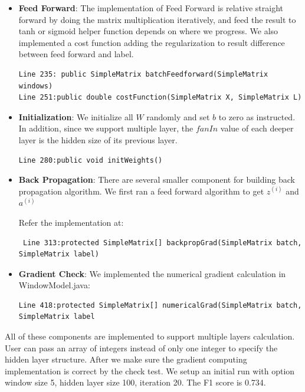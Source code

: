\documentclass[letterpaper]{article}
\begin{document}
\begin{itemize}
\item \textbf{Feed Forward}: The implementation of Feed Forward is relative straight forward by doing the matrix multiplication iteratively, and feed the result to tanh or sigmoid helper function depends on where we progress. We also implemented a cost function adding the regularization to result difference between feed forward and label.
\begin{verbatim}
Line 235: public SimpleMatrix batchFeedforward(SimpleMatrix windows)
Line 251:public double costFunction(SimpleMatrix X, SimpleMatrix L)
\end{verbatim}

\item \textbf{Initialization}: We initialize all $W$ randomly and set $b$ to zero as instructed. In addition, since we support multiple layer, the $fanIn$ value of each deeper layer is the hidden size of its previous layer.
\begin{verbatim}
Line 280:public void initWeights()
\end{verbatim}
\item \textbf{Back Propagation}: There are several smaller component for building back propagation algorithm.
We first ran a feed forward algorithm to get $z^{(i)}$ and $a^{(i)}$

Refer the implementation at:
\begin{verbatim}
 Line 313:protected SimpleMatrix[] backpropGrad(SimpleMatrix batch, SimpleMatrix label)
 \end{verbatim}
  
\item \textbf{Gradient Check}: 
We implemented the numerical gradient calculation in WindowModel.java:
\begin{verbatim}
Line 418:protected SimpleMatrix[] numericalGrad(SimpleMatrix batch, SimpleMatrix label
\end{verbatim}

\end{itemize}

All of these components are implemented to support multiple layers calculation. User can pass an array of integers instead of only one integer to specify the hidden layer structure.
After we make sure the gradient computing implementation is correct by the check test. We setup an initial run with option window size 5, hidden layer size 100, iteration 20. The F1 score is 0.734.
\end{document}
